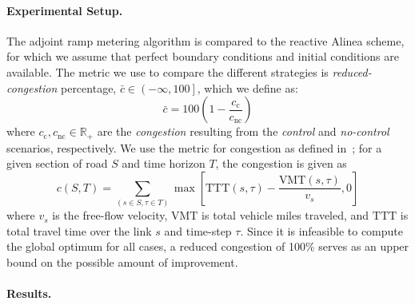 						
\paragraph{Experimental Setup.}
						
The adjoint ramp metering algorithm is compared to the reactive Alinea
scheme, for which we assume that perfect boundary conditions and initial conditions
are available. The metric we use to compare the different strategies is \emph{reduced-congestion} percentage, $\bar{c} \in \left(-\infty,100\right]$, which we define as:
\[
\bar{c} = 100 \left(1 - \frac{c_\text{c}}{c_{\text{nc}}}\right)
\]where $c_\text{c}, c_{\text{nc}} \in \mathbb{R}_+$ are the \emph{congestion} resulting from the \emph{control} and \emph{no-control} scenarios, respectively. We use the metric for congestion as defined in~\cite{Skabardonis2003}; for a given section of road $S$ and time horizon $T$, the congestion is given as
\[
c\left(S,T\right) = \sum_{\left(s\in S, \tau\in T\right)} \max \left[\text{TTT}\left(s,\tau\right) - \frac{\text{VMT}\left(s, \tau\right)}{v_s}, 0\right]
\] where $v_s$ is the free-flow velocity, $\text{VMT}$ is total vehicle miles traveled, and $\text{TTT}$ is total travel time over the link $s$ and time-step $\tau$. Since it is infeasible to compute the global optimum for all cases, a reduced congestion of 100\% serves as an upper bound on the possible amount of improvement.

\paragraph{Results.}
						
